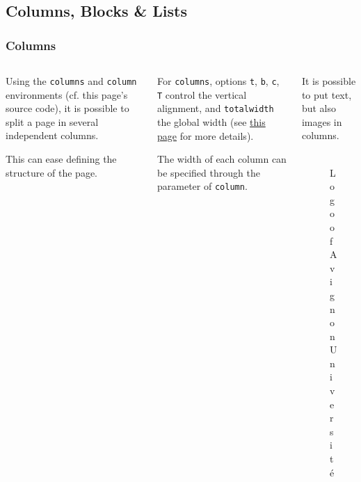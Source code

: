 \documentclass[10pt,    %
    english,            %
    xcolor=table,       %
    envcountsect,        %
    aspectratio=169     %
]{beamer}
\begin{document}
\subsection{Columns, Blocks \& Lists}
\begin{frame}
    \frametitle{Columns}
    
    \begin{columns}[T,totalwidth=\textwidth] %
        \begin{column}{0.33\textwidth}
            Using the \texttt{columns} and \texttt{column} environments (cf. this page's source code), it is possible to split a page in several independent columns. 
            
            This can ease defining the structure of the page.
        \end{column}
        
        \begin{column}{0.33\textwidth}
            For \texttt{columns}, options \texttt{t}, \texttt{b}, \texttt{c}, \texttt{T} control the vertical alignment, and \texttt{totalwidth} the global width (see \href{https://tex.stackexchange.com/a/51509/31360}{this page} for more details).
            
            The width of each column can be specified through the parameter of \texttt{column}.
        \end{column}
        
        \begin{column}{0.33\textwidth}
            It is possible to put text, but also images in columns.
            \begin{figure}[H]
                \centering
                \includegraphics[scale=1]{csg-temp/backgrounds/au_logo.pdf}
                \vspace{-0.5cm}
                \caption{Logo of Avignon Université}
                \label{fig:AUlogo}
            \end{figure}
        \end{column}
    \end{columns}
\end{frame}
\end{document}
